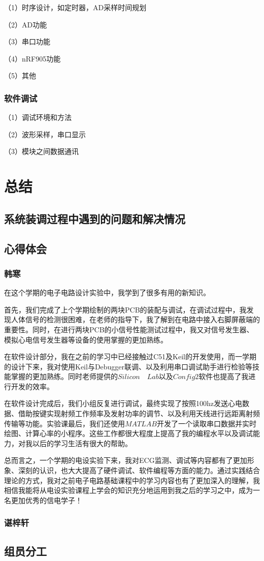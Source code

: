 \documentclass{zjureport}
\begin{document}
	（1）时序设计，如定时器，AD采样时间规划   
	    
	（2）AD功能                   
	              
	（3）串口功能              
	                
	（4）nRF905功能            
	            
	（5）其他
	
	
	\subsubsection{软件调试}
	
	（1）调试环境和方法
	
	（2）波形采样，串口显示   
	               
	（3）模块之间数据通讯      
	
	\section{总结}
	
	\subsection{系统装调过程中遇到的问题和解决情况}
	
	\subsection{心得体会}
	
	\subsubsection{韩寒}
	
	在这个学期的电子电路设计实验中，我学到了很多有用的新知识。
	
	首先，我们完成了上个学期绘制的两块PCB的装配与调试，在调试过程中，我发现人体信号的检测很困难，在老师的指导下，我了解到在电路中接入右脚屏蔽端的重要性。同时，在进行两块PCB的小信号性能测试过程中，我又对信号发生器、模拟心电信号发生器等设备的使用掌握的更加熟练。
	
	在软件设计部分，我在之前的学习中已经接触过C51及Keil的开发使用，而一学期的设计下来，我对使用Keil与Debugger联调、以及利用串口调试助手进行检验等技能掌握的更加熟练。同时老师提供的$Silicon \quad Lab$以及$Config2$软件也提高了我进行开发的效率。
	
	在软件设计完成后，我们小组反复进行调试，最终实现了按照100hz发送心电数据、借助按键实现射频工作频率及发射功率的调节、以及利用天线进行远距离射频传输等功能。实验课最后，我们还使用$MATLAB$开发了一个读取串口数据并实时绘图、计算心率的小程序。这些工作都很大程度上提高了我的编程水平以及调试能力，对我以后的学习生活有很大的帮助。
	
	总而言之，一个学期的电设实验下来，我对ECG监测、调试等内容都有了更加形象、深刻的认识，也大大提高了硬件调试、软件编程等方面的能力。通过实践结合理论的方式，我对之前电子电路基础课程中的学习内容也有了更加深入的理解，我相信我能将从电设实验课程上学会的知识充分地运用到我之后的学习之中，成为一名更加优秀的信电学子！
	
	\subsubsection{谌梓轩}
	
	\subsection{组员分工}
	
	
	
\end{document}
